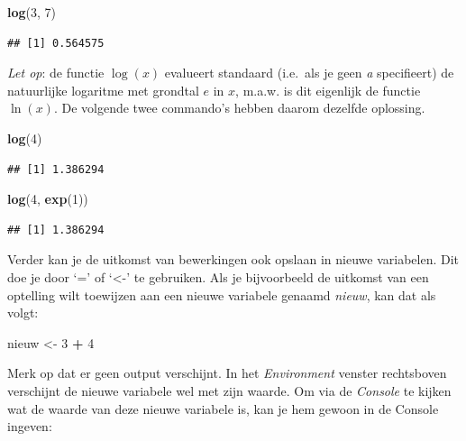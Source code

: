 \documentclass[
]{book}
\newenvironment{Shaded}{\begin{snugshade}}{\end{snugshade}}
\newcommand{\DecValTok}[1]{\textcolor[rgb]{0.00,0.00,0.81}{#1}}
\newcommand{\FunctionTok}[1]{\textcolor[rgb]{0.13,0.29,0.53}{\textbf{#1}}}
\newcommand{\NormalTok}[1]{#1}
\newcommand{\OtherTok}[1]{\textcolor[rgb]{0.56,0.35,0.01}{#1}}
\newcommand{\SpecialCharTok}[1]{\textcolor[rgb]{0.81,0.36,0.00}{\textbf{#1}}}
\begin{document}
\begin{Shaded}
\begin{Highlighting}[]
\FunctionTok{log}\NormalTok{(}\DecValTok{3}\NormalTok{, }\DecValTok{7}\NormalTok{)}
\end{Highlighting}
\end{Shaded}

\begin{verbatim}
## [1] 0.564575
\end{verbatim}

\emph{Let op}: de functie \(\log(x)\) evalueert standaard (i.e.~als je geen \emph{a} specifieert) de natuurlijke logaritme met grondtal \(e\) in \(x\), m.a.w. is dit eigenlijk de functie \(\ln(x)\). De volgende twee commando's hebben daarom dezelfde oplossing.

\begin{Shaded}
\begin{Highlighting}[]
\FunctionTok{log}\NormalTok{(}\DecValTok{4}\NormalTok{)}
\end{Highlighting}
\end{Shaded}

\begin{verbatim}
## [1] 1.386294
\end{verbatim}

\begin{Shaded}
\begin{Highlighting}[]
\FunctionTok{log}\NormalTok{(}\DecValTok{4}\NormalTok{, }\FunctionTok{exp}\NormalTok{(}\DecValTok{1}\NormalTok{))}
\end{Highlighting}
\end{Shaded}

\begin{verbatim}
## [1] 1.386294
\end{verbatim}

Verder kan je de uitkomst van bewerkingen ook opslaan in nieuwe variabelen. Dit
doe je door `=' of `\textless-' te gebruiken. Als je bijvoorbeeld de uitkomst van een optelling
wilt toewijzen aan een nieuwe variabele genaamd \emph{nieuw}, kan dat als volgt:

\begin{Shaded}
\begin{Highlighting}[]
\NormalTok{nieuw }\OtherTok{\textless{}{-}} \DecValTok{3} \SpecialCharTok{+} \DecValTok{4}
\end{Highlighting}
\end{Shaded}

Merk op dat er geen output verschijnt. In het \emph{Environment} venster rechtsboven verschijnt de nieuwe variabele wel met zijn waarde. Om via de \emph{Console} te kijken wat de waarde van deze nieuwe variabele is, kan je hem gewoon in de Console ingeven:
\end{document}
